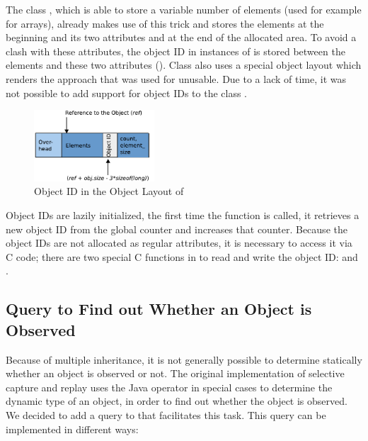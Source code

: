 The class , which is able to store a variable number of elements (used for example for arrays), already makes use of this trick and stores the elements at the beginning and its two attributes  and  at the end of the allocated area. To avoid a clash with these attributes, the object ID in instances of  is stored between the elements and these two attributes (). Class  also uses a special object layout which renders the approach that was used for  unusable. Due to a lack of time, it was not possible to add support for object IDs to the class .
\begin{figure}[ht]
  \centering
  \includegraphics[width=0.4\textwidth]{illustrations/special_object_id}
  \caption{Object ID in the Object Layout of }
  \label{fig:special_object_id}
\end{figure}

Object IDs are lazily initialized, the first time the function  is called, it retrieves a new object ID from the global counter  and increases that counter. Because the object IDs are not allocated as regular attributes, it is necessary to access it via C code; there are two special C functions in  to read and write the object ID:  and .


\subsection{Query to Find out Whether an Object is Observed}
\label{lbl:is_observed}
Because of multiple inheritance, it is not generally possible to determine statically whether an object is observed or not. The original implementation of selective capture and replay uses the Java operator  in special cases to determine the dynamic type of an object, in order to find out whether the object is observed. We decided to add a query to  that facilitates this task. This query can be implemented in different ways: 

